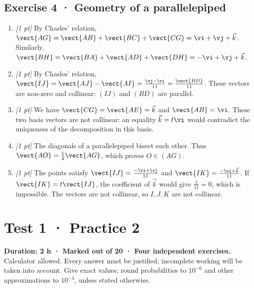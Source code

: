 \subsection*{Exercise 4 · Geometry of a parallelepiped}\begin{enumerate}

\item \textit{[1 pt]} By Chasles' relation, $\vect{AG}=\vect{AB}+\vect{BC}+\vect{CG}=\vi +\vj +\vec k$. Similarly, $\vect{BH}=\vect{BA}+\vect{AD}+\vect{DH}=-\vi +\vj +\vec k$.

\item \textit{[1 pt]} By Chasles' relation, $\vect{IJ}=\vect{AJ}-\vect{AI}=\frac{\vj -\vi }{11}=\frac{\vect{BD}}{11}$. These vectors are non-zero and collinear: $(IJ)$ and $(BD)$ are parallel.

\item \textit{[1 pt]} We have $\vect{CG}=\vect{AE}=\vec k$ and $\vect{AB}=\vi $. These two basis vectors are not collinear: an equality $\vec k=t\vi $ would contradict the uniqueness of the decomposition in this basis.

\item \textit{[1 pt]} The diagonals of a parallelepiped bisect each other. Thus $\vect{AO}=\frac12\vect{AG}$, which proves $O\in(AG)$.

\item \textit{[1 pt]} The points satisfy $\vect{IJ}=\frac{-\vi +\vj }{11}$ and $\vect{IK}=\frac{-\vi +\vec k}{11}$. If $\vect{IK}=t\vect{IJ}$, the coefficient of $\vec k$ would give $\frac{1}{11}=0$, which is impossible. The vectors are not collinear, so $I,J,K$ are not collinear.

\end{enumerate}

\fi

\mxnewpage{}\label{sujet:1-2}

\section*{Test 1 · Practice 2}


\textbf{Duration: 2 h · Marked out of 20 · Four independent exercises.}\\Calculator allowed. Every answer must be justified; incomplete working will be taken into account. Give exact values; round probabilities to $10^{-6}$ and other approximations to $10^{-4}$, unless stated otherwise.

